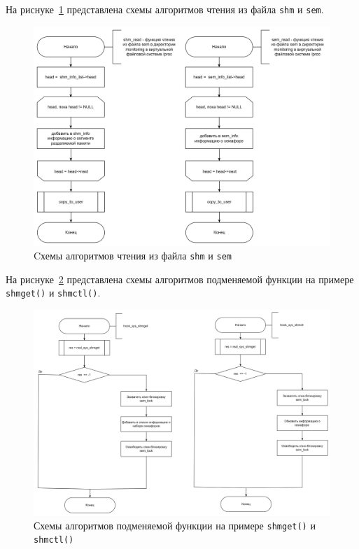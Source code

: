 \clearpage

На риснуке~\ref{img:alg:shm-sem} представлена схемы алгоритмов чтения из файла \texttt{shm} и \texttt{sem}.

\begin{figure}[h]
	\centering
	\includegraphics[height=0.5\textheight]{img/alg-shm-sem.png}
	\caption{Cхемы алгоритмов чтения из файла \texttt{shm} и \texttt{sem}}
	\label{img:alg:shm-sem}
\end{figure}

\clearpage

На риснуке~\ref{img:alg:hook-sem} представлена схемы алгоритмов подменяемой функции на примере \texttt{shmget()} и \texttt{shmctl()}.

\begin{figure}[h]
	\centering
	\includegraphics[height=0.4\textheight]{img/alg-hook-sem.png}
	\caption{Схемы алгоритмов подменяемой функции на примере \texttt{shmget()} и \texttt{shmctl()}}
	\label{img:alg:hook-sem}
\end{figure}